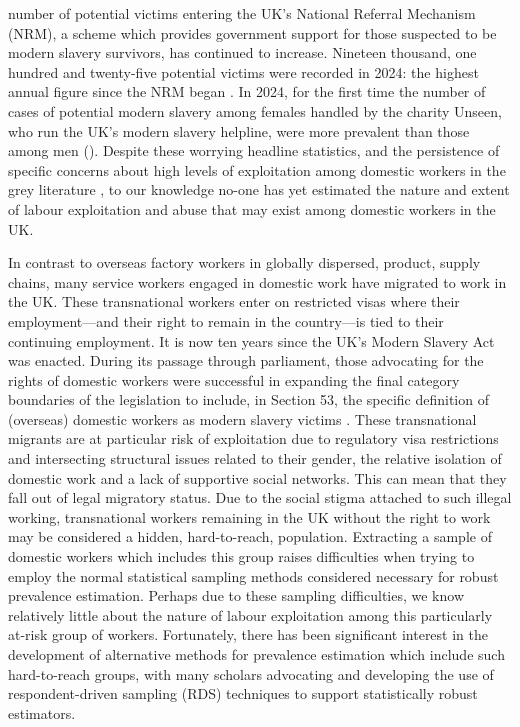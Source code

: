 \documentclass[
  12pt,
  letterpaper,
  DIV=11,
  numbers=noendperiod]{scrartcl}
\theoremstyle{plain}
\theoremstyle{definition}
\begin{document}
number of potential victims entering the UK's National Referral
Mechanism (NRM), a scheme which provides government support for those
suspected to be modern slavery survivors, has continued to increase.
Nineteen thousand, one hundred and twenty-five potential victims were
recorded in 2024: the highest annual figure since the NRM began
\autocite{home_office_modern_2025}. In 2024, for the
first time the number of cases of potential modern slavery among females
handled by the charity Unseen, who run the UK's modern slavery helpline,
were more prevalent than those among men 
(\cite{carter_women_2025}). Despite these worrying
headline statistics, and the persistence of specific concerns about high
levels of exploitation among domestic workers in the grey literature
\autocite{kalayaan_new_2008, mantouvalou_modern_2016, latin_american_womens_rights_service_behind_2023}, to our knowledge no-one has yet estimated the nature and extent of labour exploitation and abuse that may exist among domestic workers in the UK.

In contrast to overseas factory workers in globally dispersed, product,
supply chains, many service workers engaged in domestic work have
migrated to work in the UK. These transnational workers enter on
restricted visas where their employment---and their right to remain in
the country---is tied to their continuing employment. It is now ten
years since the UK's Modern Slavery Act was enacted. During its passage
through parliament, those advocating for the rights of domestic workers
were successful in expanding the final category boundaries of the
legislation to include, in Section 53, the specific definition of
(overseas) domestic workers as modern slavery victims 
\autocite{caruana_boundaries_2025}. These transnational
migrants are at particular risk of exploitation due to regulatory visa
restrictions and intersecting structural issues related to their gender,
the relative isolation of domestic work and a lack of supportive social
networks. This can mean that they fall out of legal migratory status.
Due to the social stigma attached to such illegal working, transnational
workers remaining in the UK without the right to work may be considered
a hidden, hard-to-reach, population. Extracting a sample of domestic
workers which includes this group raises difficulties when trying to
employ the normal statistical sampling methods considered necessary for
robust prevalence estimation. Perhaps due to these sampling
difficulties, we know relatively little about the nature of labour
exploitation among this particularly at-risk group of workers.
Fortunately, there has been significant interest in the development of
alternative methods for prevalence estimation which include such
hard-to-reach groups, with many scholars advocating and developing the
use of respondent-driven sampling (RDS) techniques to support
statistically robust estimators.
\end{document}
